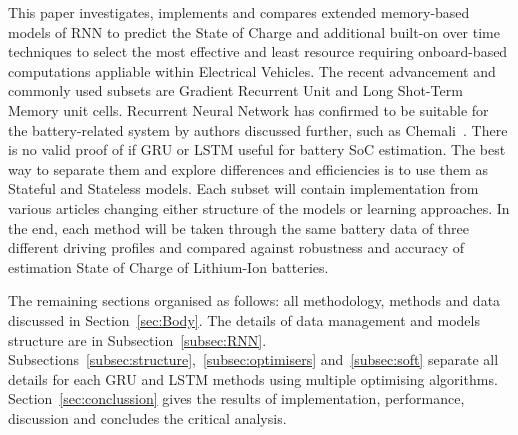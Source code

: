 %
%
This paper investigates, implements and compares extended memory-based models of RNN to predict the State of Charge and additional built-on over time techniques to select the most effective and least resource requiring onboard-based computations appliable within Electrical Vehicles.
The recent advancement and commonly used subsets are Gradient Recurrent Unit and Long Shot-Term Memory unit cells. Recurrent Neural Network has confirmed to be suitable for the battery-related system by authors discussed further, such as Chemali~\cite{LSTM_Hochreiter1997}.
There is no valid proof of if GRU or LSTM useful for battery SoC estimation.
The best way to separate them and explore differences and efficiencies is to use them as Stateful and Stateless models.
Each subset will contain implementation from various articles changing either structure of the models or learning approaches.
In the end, each method will be taken through the same battery data of three different driving profiles and compared against robustness and accuracy of estimation State of Charge of Lithium-Ion batteries.

%
%
The remaining sections organised as follows: all methodology, methods and data discussed in Section~\ref{sec:Body}.
The details of data management and models structure are in Subsection~\ref{subsec:RNN}.
Subsections~\ref{subsec:structure},~\ref{subsec:optimisers} and~\ref{subsec:soft} separate all details for each GRU and LSTM methods using multiple optimising algorithms.
Section~\ref{sec:conclussion} gives the results of implementation, performance, discussion and concludes the critical analysis.